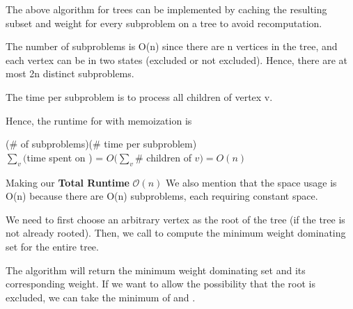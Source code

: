 \documentclass{article}
\begin{document}
\begin{solution}
\begin{quote}
\begin{steps}
\end{steps}
\end{quote}
\begin{subproof}

The above algorithm for trees can be implemented by caching the resulting subset and weight for every subproblem on a tree  to avoid recomputation.

The number of subproblems is O(n) since there are n vertices in the tree, and each vertex can be in two states (excluded or not excluded). Hence, there are at most 2n distinct subproblems.

The time per subproblem is to process all children of vertex v.

Hence, the runtime for  with memoization is
\begin{center}
(\# of subproblems)(\# time per subproblem)\\
\( \sum_v( \)time spent on ) = \( O\bigg(\sum_v\# \) children of \( v\bigg) = O(n) \)
\end{center}

Making our \textbf{Total Runtime} \( \mathcal{O}(n) \)
We also mention that the space usage is O(n) because there are O(n) subproblems, each requiring constant space.

\end{subproof}
\begin{subproof}
We need to first choose an arbitrary vertex as the root of the tree (if the tree is not already rooted). Then, we call  to compute the minimum weight dominating set for the entire tree.

The algorithm will return the minimum weight dominating set and its corresponding weight. If we want to allow the possibility that the root is excluded, we can take the minimum of  and .
\end{subproof}
\end{solution}
\pagebreak
\end{document}

